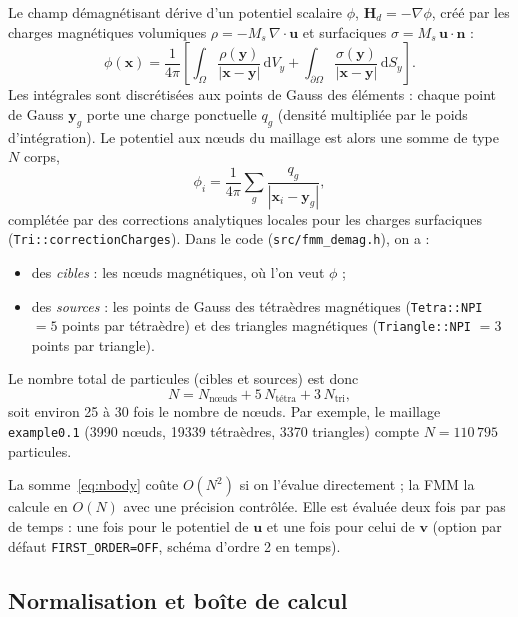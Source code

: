 \documentclass[11pt,a4paper]{article}
\newcommand{\code}[1]{\texttt{#1}}
\begin{document}
Le champ démagnétisant dérive d'un potentiel scalaire $\phi$, $\mathbf{H}_d = -\nabla\phi$, créé
par les charges magnétiques volumiques $\rho = -M_s\,\nabla\cdot\mathbf{u}$ et surfaciques
$\sigma = M_s\,\mathbf{u}\cdot\mathbf{n}$ :
\begin{equation}
\phi(\mathbf{x}) = \frac{1}{4\pi}\left[\int_\Omega \frac{\rho(\mathbf{y})}{|\mathbf{x}-\mathbf{y}|}\,
\mathrm{d}V_y + \int_{\partial\Omega} \frac{\sigma(\mathbf{y})}{|\mathbf{x}-\mathbf{y}|}\,
\mathrm{d}S_y\right].
\label{eq:phi}
\end{equation}
Les intégrales sont discrétisées aux points de Gauss des éléments : chaque point de Gauss
$\mathbf{y}_g$ porte une charge ponctuelle $q_g$ (densité multipliée par le poids d'intégration).
Le potentiel aux nœuds du maillage est alors une somme de type $N$ corps,
\begin{equation}
\phi_i = \frac{1}{4\pi}\sum_g \frac{q_g}{|\mathbf{x}_i - \mathbf{y}_g|},
\label{eq:nbody}
\end{equation}
complétée par des corrections analytiques locales pour les charges surfaciques
(\code{Tri::correctionCharges}). Dans le code (\code{src/fmm\_demag.h}), on a :
\begin{itemize}
  \item des \emph{cibles} : les nœuds magnétiques, où l'on veut $\phi$ ;
  \item des \emph{sources} : les points de Gauss des tétraèdres magnétiques (\code{Tetra::NPI}
        $= 5$ points par tétraèdre) et des triangles magnétiques (\code{Triangle::NPI} $= 3$
        points par triangle).
\end{itemize}
Le nombre total de particules (cibles et sources) est donc
\begin{equation}
N = N_{\text{nœuds}} + 5\,N_{\text{tétra}} + 3\,N_{\text{tri}},
\end{equation}
soit environ 25 à 30 fois le nombre de nœuds. Par exemple, le maillage \code{example0.1}
(3990 nœuds, 19339 tétraèdres, 3370 triangles) compte $N = 110\,795$ particules.

La somme~\eqref{eq:nbody} coûte $O(N^2)$ si on l'évalue directement ; la FMM la calcule en
$O(N)$ avec une précision contrôlée. Elle est évaluée deux fois par pas de temps : une fois pour
le potentiel de $\mathbf{u}$ et une fois pour celui de $\mathbf{v}$ (option par défaut
\code{FIRST\_ORDER=OFF}, schéma d'ordre 2 en temps).

\subsection{Normalisation et boîte de calcul}
\end{document}
